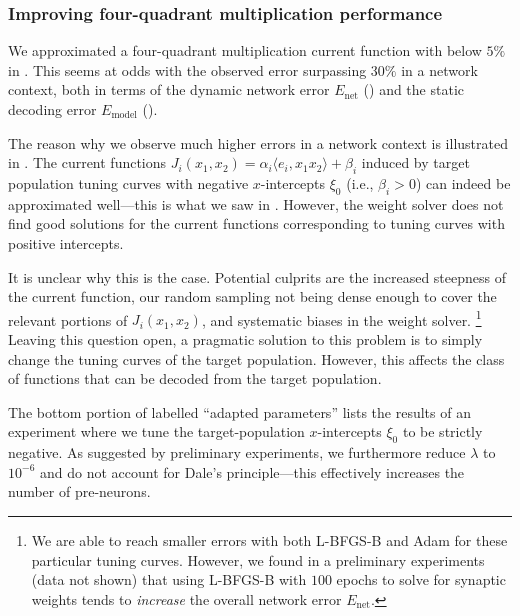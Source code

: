 \subsubsection{Improving four-quadrant multiplication performance}
We approximated a four-quadrant multiplication current function with \NRMSE below $5\%$ in .
This seems at odds with the observed error surpassing $30\%$ in a network context, both in terms of the dynamic network error $E_\mathrm{net}$ () and the static decoding error $E_\mathrm{model}$ ().

The reason why we observe much higher errors in a network context is illustrated in .
The current functions $J_i(x_1, x_2) = \alpha_i \langle e_i, x_1 x_2 \rangle + \beta_i$ induced by target population tuning curves with negative $x$-intercepts $\xi_0$ (i.e., $\beta_i > 0$) can indeed be approximated well---this is what we saw in .
However, the weight solver does not find good solutions for the current functions corresponding to tuning curves with positive intercepts.

It is unclear why this is the case.
Potential culprits are the increased steepness of the current function, our random sampling not being dense enough to cover the relevant portions of $J_i(x_1, x_2)$, and systematic biases in the weight solver.%
\footnote{
We are able to reach smaller errors with both L-BFGS-B and Adam for these particular tuning curves.
However, we found in a preliminary experiments (data not shown) that using L-BFGS-B with $100$ epochs to solve for synaptic weights tends to \emph{increase} the overall network error $E_\mathrm{net}$.
}
Leaving this question open, a pragmatic solution to this problem is to simply change the tuning curves of the target population.
However, this affects the class of functions that can be decoded from the target population.

The bottom portion of  labelled \enquote{adapted parameters} lists the results of an experiment where we tune the target-population $x$-intercepts $\xi_0$ to be strictly negative.
As suggested by preliminary experiments, we furthermore reduce $\lambda$ to $10^{-6}$ and do not account for Dale's principle---this effectively increases the number of pre-neurons.


